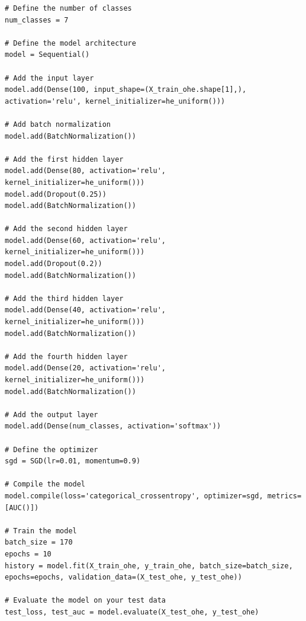 \begin{appendices}
\begin{lstlisting}
# Define the number of classes
num_classes = 7

# Define the model architecture
model = Sequential()

# Add the input layer
model.add(Dense(100, input_shape=(X_train_ohe.shape[1],), activation='relu', kernel_initializer=he_uniform()))

# Add batch normalization
model.add(BatchNormalization())

# Add the first hidden layer
model.add(Dense(80, activation='relu', kernel_initializer=he_uniform()))
model.add(Dropout(0.25))
model.add(BatchNormalization())

# Add the second hidden layer
model.add(Dense(60, activation='relu', kernel_initializer=he_uniform()))
model.add(Dropout(0.2))
model.add(BatchNormalization())

# Add the third hidden layer
model.add(Dense(40, activation='relu', kernel_initializer=he_uniform()))
model.add(BatchNormalization())

# Add the fourth hidden layer
model.add(Dense(20, activation='relu', kernel_initializer=he_uniform()))
model.add(BatchNormalization())

# Add the output layer
model.add(Dense(num_classes, activation='softmax'))

# Define the optimizer
sgd = SGD(lr=0.01, momentum=0.9)

# Compile the model
model.compile(loss='categorical_crossentropy', optimizer=sgd, metrics=[AUC()])

# Train the model
batch_size = 170
epochs = 10
history = model.fit(X_train_ohe, y_train_ohe, batch_size=batch_size, epochs=epochs, validation_data=(X_test_ohe, y_test_ohe))

# Evaluate the model on your test data
test_loss, test_auc = model.evaluate(X_test_ohe, y_test_ohe)
\end{lstlisting}



\end{appendices}


